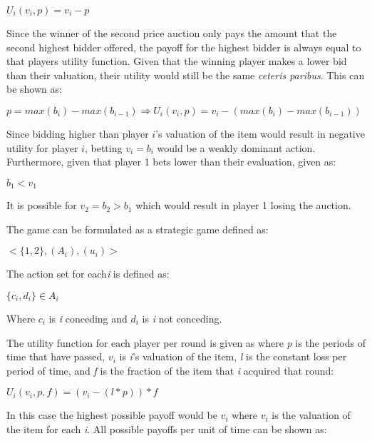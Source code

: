\documentclass{homework}
\begin{document}
\indent\hspace{18pt}$U_{i}(v_{i}, p) = v_{i} - p$

Since the winner of the second price auction only pays the amount that the second highest bidder offered, the payoff for the highest bidder is always equal to that players utility function. Given that the winning player makes a lower bid than their valuation, their utility would still be the same \emph{ceteris paribus}. This can be shown as:

$p = max(b_{i}) - max(b_{i-1}) \Rightarrow U_{i}(v_{i}, p) = v_{i} - (max(b_{i}) - max(b_{i-1}))$

Since bidding higher than player $i$'s valuation of the item would result in negative utility for player $i$, betting $v_{i} = b_{i}$ would be a weakly dominant action. Furthermore, given that player 1 bets lower than their evaluation, given as: 

$b_{1} < v_{1}$

It is possible for $v_{2} = b_{2} > b_{1}$ which would result in player 1 losing the auction.

\exercise[18.5]
The game can be formulated as a strategic game defined as:

\indent\hspace{18pt}$<\{1,2\},(A_{i}),(u_{i})>$

The action set for each\emph{i} is defined as:

\indent\hspace{18pt}${\{c_{i}, d_{i}\}} \in A_{i}$

Where $c_{i}$ is \emph{i} conceding and $d_{i}$ is \emph{i} not conceding.

The utility function for each player per round is given as where \emph{p} is the periods of time that have passed, $v_{i}$ is \emph{i}'s valuation of the item, \emph{l} is the constant loss per period of time, and \emph{f} is the fraction of the item that \emph{i} acquired that round:

\indent\hspace{18pt}$U_{i}(v_{i},p,f) = (v_{i} - (l*p))*f$

In this case the highest possible payoff would be $v_{i}$ where $v_{i}$ is the valuation of the item for each \emph{i}. All possible payoffs per unit of time can be shown as:
\end{document}
